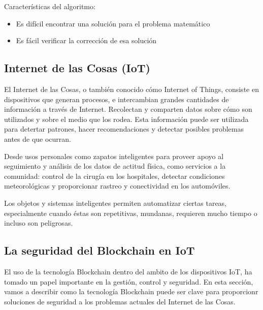 \noindent Características del algoritmo: 

\begin{itemize}
    \item Es difícil encontrar una solución para el problema matemático
    \item Es fácil verificar la corrección de esa solución
\end{itemize}

\subsection{Internet de las Cosas (IoT)}

El Internet de las Cosas, o también conocido cómo Internet of Things, consiste en dispositivos que generan procesos, e 
intercambian grandes cantidades de información a través de Internet. Recolectan y comparten datos sobre cómo son 
utilizados y sobre el medio que los rodea. Esta información puede ser utilizada para detertar patrones, hacer 
recomendaciones y detectar posibles problemas antes de que ocurran.

\vspace{5mm}

\noindent Desde usos personales como zapatos inteligentes para proveer apoyo al seguimiento y análisis de los datos de 
actitud física, como servicios a la comunidad: control de la cirugía en los hospitales, detectar condiciones 
meteorológicas y proporcionar rastreo y conectividad en los automóviles.

\vspace{5mm}

\noindent  Los objetos y sistemas inteligentes permiten automatizar ciertas tareas, especialmente cuando éstas son 
repetitivas, mundanas, requieren mucho tiempo o incluso son peligrosas.

\subsection{La seguridad del Blockchain en IoT}

El uso de la tecnología Blockchain dentro del ambito de los dispositivos IoT, ha tomado un papel importante en la 
gestión, control y seguridad. En esta sección, vamos a describir como la tecnología Blockchain puede ser clave para
proporcionr soluciones de seguridad a los problemas actuales del Internet de las Cosas.

